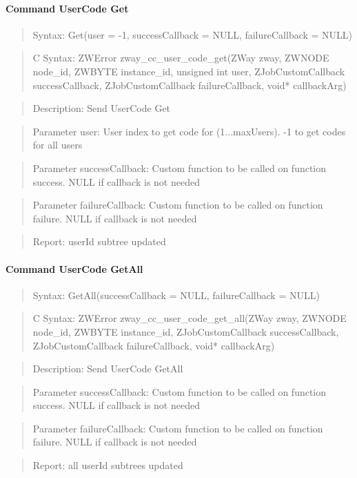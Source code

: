 \paragraph{Command UserCode Get}
\begin{quote}Syntax: Get(user = -1, successCallback = NULL, failureCallback = NULL)\end{quote}
\begin{quote}C Syntax: ZWError zway\_cc\_user\_code\_get(ZWay zway, ZWNODE node\_id, ZWBYTE instance\_id, unsigned int user, ZJobCustomCallback successCallback, ZJobCustomCallback failureCallback, void* callbackArg)\end{quote}
\begin{quote}Description: Send UserCode Get\end{quote}
\begin{quote}Parameter user: User index to get code for (1...maxUsers). -1 to get codes for all users\end{quote}
\begin{quote}Parameter successCallback: Custom function to be called on function success. NULL if callback is not needed\end{quote}
\begin{quote}Parameter failureCallback: Custom function to be called on function failure. NULL if callback is not needed\end{quote}
\begin{quote}Report: userId subtree updated\end{quote}

\paragraph{Command UserCode GetAll}
\begin{quote}Syntax: GetAll(successCallback = NULL, failureCallback = NULL)\end{quote}
\begin{quote}C Syntax: ZWError zway\_cc\_user\_code\_get\_all(ZWay zway, ZWNODE node\_id, ZWBYTE instance\_id, ZJobCustomCallback successCallback, ZJobCustomCallback failureCallback, void* callbackArg)\end{quote}
\begin{quote}Description: Send UserCode GetAll\end{quote}
\begin{quote}Parameter successCallback: Custom function to be called on function success. NULL if callback is not needed\end{quote}
\begin{quote}Parameter failureCallback: Custom function to be called on function failure. NULL if callback is not needed\end{quote}
\begin{quote}Report: all userId subtrees updated\end{quote}

